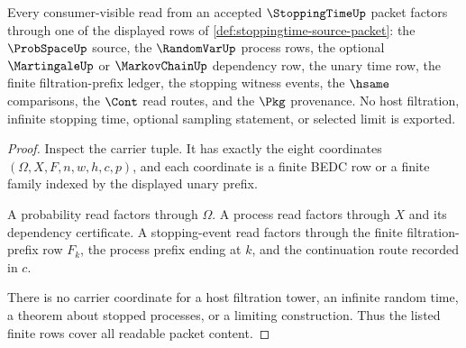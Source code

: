 \begin{theorem}
\label{thm:stoppingtime-ledger-coverage}
Every consumer-visible read from an accepted $\StoppingTimeUp$ packet factors
through one of the displayed rows of
\autoref{def:stoppingtime-source-packet}: the $\ProbSpaceUp$ source, the
$\RandomVarUp$ process rows, the optional $\MartingaleUp$ or $\MarkovChainUp$
dependency row, the unary time row, the finite filtration-prefix ledger, the
stopping witness events, the $\hsame$ comparisons, the $\Cont$ read routes,
and the $\Pkg$ provenance. No host filtration, infinite stopping time, optional
sampling statement, or selected limit is exported.
\end{theorem}
\begin{proof}
Inspect the carrier tuple. It has exactly the eight coordinates
$(\Omega,X,F,n,w,h,c,p)$, and each coordinate is a finite BEDC row or a finite
family indexed by the displayed unary prefix.

A probability read factors through $\Omega$. A process read factors through
$X$ and its dependency certificate. A stopping-event read factors through the
finite filtration-prefix row $F_k$, the process prefix ending at $k$, and the
continuation route recorded in $c$.

There is no carrier coordinate for a host filtration tower, an infinite
random time, a theorem about stopped processes, or a limiting construction.
Thus the listed finite rows cover all readable packet content.
\end{proof}

